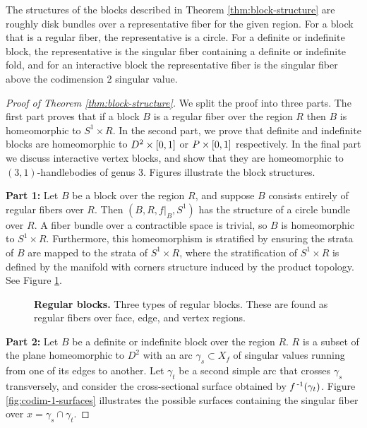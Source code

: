 \begin{rmk}
	The structures of the blocks described in Theorem \ref{thm:block-structure} are roughly disk bundles over a representative fiber for the given region.
	For a block that is a regular fiber, the representative is a circle.
	For a definite or indefinite block, the representative is the singular fiber containing a definite or indefinite fold, and for an interactive block the representative fiber is the singular fiber above the codimension 2 singular value.
\end{rmk}

\begin{proof}[Proof of Theorem \ref{thm:block-structure}]
	We split the proof into three parts.
	The first part proves that if a block $B$ is a regular fiber over the region $R$ then $B$ is homeomorphic to $S^1\times R$.
	In the second part, we prove that definite and indefinite blocks are homeomorphic to $D^2\times[0,1]$ or $P\times[0,1]$ respectively.
	In the final part we discuss interactive vertex blocks, and show that they are homeomorphic to $(3,1)$-handlebodies of genus 3.
	Figures illustrate the block structures.
	
	\textbf{Part 1:}
	Let $B$ be a block over the region $R$, and suppose $B$ consists entirely of regular fibers over $R$.
	Then $(B, R, f|_B, S^1)$ has the structure of a circle bundle over $R$.
	A fiber bundle over a contractible space is trivial, so $B$ is homeomorphic to $S^1 \times R$.
	Furthermore, this homeomorphism is stratified by ensuring the strata of $B$ are mapped to the strata of $S^1 \times R$, where the stratification of $S^1 \times R$ is defined by the manifold with corners structure induced by the product topology.
	See Figure \ref{fig:regular-blocks}.
	
	\begin{figure}[h!]
		\caption{
			\textbf{Regular blocks.}
			Three types of regular blocks.
			These are found as regular fibers over face, edge, and vertex regions.
		}
		\label{fig:regular-blocks}
	\end{figure}
	
	\textbf{Part 2:}
	Let $B$ be a definite or indefinite block over the region $R$.
	$R$ is a subset of the plane homeomorphic to $D^2$ with an arc $\gamma_s \subset X_f$ of singular values running from one of its edges to another.
	Let $\gamma_t$ be a second simple arc that crosses $\gamma_s$ transversely, and consider the cross-sectional surface obtained by $f^{\,\text{-}1}(\gamma_t)$.
	Figure \ref{fig:codim-1-surfaces} illustrates the possible surfaces containing the singular fiber over $x=\gamma_s\cap\gamma_t$.
	

\end{proof}
